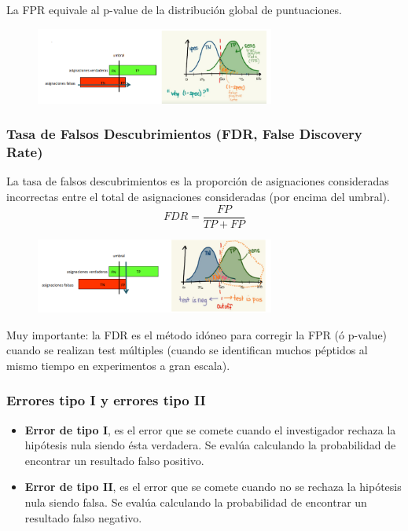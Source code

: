 La FPR equivale al p-value de la distribución global de puntuaciones.

\begin{figure}[h]
\centering
\includegraphics[width = 0.7\textwidth]{figs/fpr.png}
\end{figure}

\subsubsection{Tasa de Falsos Descubrimientos (FDR, False Discovery Rate)}
La tasa de falsos descubrimientos es la proporción de asignaciones consideradas incorrectas entre el total de asignaciones consideradas (por encima del umbral).
$$FDR = \frac{FP}{TP + FP}$$

\begin{figure}[h]
\centering
\includegraphics[width = 0.7\textwidth]{figs/fdr.png}
\end{figure}

Muy importante: la FDR es el método idóneo para corregir la FPR (ó p-value) cuando se realizan test múltiples (cuando se identifican muchos péptidos al mismo tiempo en experimentos a gran escala).

\subsubsection{Errores tipo I y errores tipo II}
\begin{itemize}
\item \textbf{Error de tipo I}, es el error que se comete cuando el investigador rechaza la hipótesis nula siendo ésta verdadera. Se evalúa calculando la probabilidad de encontrar un resultado falso positivo.
\item \textbf{Error de tipo II}, es el error que se comete cuando no se rechaza la hipótesis nula siendo falsa. Se evalúa calculando la probabilidad de encontrar un resultado falso negativo.
\end{itemize}


